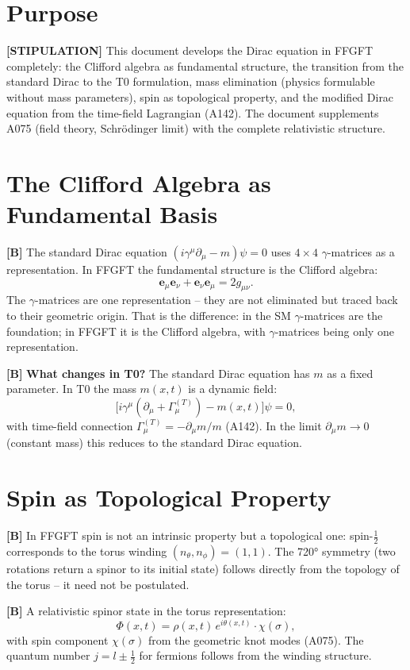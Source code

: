 \section{Purpose}

\textbf{[STIPULATION]} This document develops the Dirac equation in FFGFT
completely: the Clifford algebra as fundamental structure, the transition from the
standard Dirac to the T0 formulation, mass elimination (physics formulable without
mass parameters), spin as topological property, and the modified Dirac equation
from the time-field Lagrangian (A142). The document supplements A075 (field theory,
Schrödinger limit) with the complete relativistic structure.

\section{The Clifford Algebra as Fundamental Basis}

\textbf{[B]} The standard Dirac equation $(i\gamma^\mu\partial_\mu - m)\psi=0$
uses $4\times4$ $\gamma$-matrices as a representation. In FFGFT the fundamental
structure is the Clifford algebra:
\[
  \mathbf e_\mu\mathbf e_\nu + \mathbf e_\nu\mathbf e_\mu = 2g_{\mu\nu}.
\]
The $\gamma$-matrices are one representation -- they are not eliminated but traced
back to their geometric origin. That is the difference: in the SM $\gamma$-matrices
are the foundation; in FFGFT it is the Clifford algebra, with $\gamma$-matrices
being only one representation.

\textbf{[B]} \textbf{What changes in T0?} The standard Dirac equation has $m$ as a
fixed parameter. In T0 the mass $m(x,t)$ is a dynamic field:
\[
  \bigl[i\gamma^\mu(\partial_\mu + \Gamma_\mu^{(T)}) - m(x,t)\bigr]\psi = 0,
\]
with time-field connection $\Gamma_\mu^{(T)}=-\partial_\mu m/m$ (A142). In the
limit $\partial_\mu m\to0$ (constant mass) this reduces to the standard Dirac
equation.

\section{Spin as Topological Property}

\textbf{[B]} In FFGFT spin is not an intrinsic property but a topological one:
spin-$\tfrac12$ corresponds to the torus winding $(n_\theta,n_\phi)=(1,1)$. The
720° symmetry (two rotations return a spinor to its initial state) follows directly
from the topology of the torus -- it need not be postulated.

\textbf{[B]} A relativistic spinor state in the torus representation:
\[
  \Phi(x,t) = \rho(x,t)\,e^{i\theta(x,t)}\cdot\chi(\sigma),
\]
with spin component $\chi(\sigma)$ from the geometric knot modes (A075). The quantum
number $j=l\pm\tfrac12$ for fermions follows from the winding structure.

